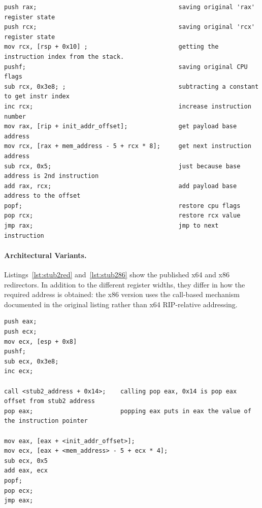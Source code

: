 \documentclass[runningheads]{llncs}
\begin{document}
\noindent\begin{minipage}{\linewidth}
\begin{lstlisting}[label={lst:stub2red},language={[x86masm]Assembler}, basicstyle=\scriptsize\ttfamily, caption={x64 redirector. Reproduced from Listing~3 of~\cite{zone_secrypt_2026}.}]
push rax;                                       saving original 'rax' register state
push rcx;                                       saving original 'rcx' register state
mov rcx, [rsp + 0x10] ;                         getting the instruction index from the stack.
pushf;                                          saving original CPU flags
sub rcx, 0x3e8; ;                               subtracting a constant to get instr index
inc rcx;                                        increase instruction number
mov rax, [rip + init_addr_offset];              get payload base address
mov rcx, [rax + mem_address - 5 + rcx * 8];     get next instruction address
sub rcx, 0x5;                                   just because base address is 2nd instruction
add rax, rcx;                                   add payload base address to the offset
popf;                                           restore cpu flags
pop rcx;                                        restore rcx value
jmp rax;                                        jmp to next instruction
\end{lstlisting}

\end{minipage}

\paragraph{Architectural Variants.}
Listings~\ref{lst:stub2red} and~\ref{lst:stub286} show the published x64 and x86 redirectors. In addition to the different register widths, they differ in how the required address is obtained: the x86 version uses the call-based mechanism documented in the original listing rather than x64 RIP-relative addressing.

\begin{lstlisting}[label={lst:stub286},language={[x86masm]Assembler}, basicstyle=\scriptsize\ttfamily, caption={x86 redirector. Reproduced from Listing~4 of~\cite{zone_secrypt_2026}.}]
push eax;
push ecx;
mov ecx, [esp + 0x8]
pushf;
sub ecx, 0x3e8;
inc ecx;

call <stub2_address + 0x14>;    calling pop eax, 0x14 is pop eax offset from stub2 address
pop eax;                        popping eax puts in eax the value of the instruction pointer

mov eax, [eax + <init_addr_offset>];
mov ecx, [eax + <mem_address> - 5 + ecx * 4];
sub ecx, 0x5
add eax, ecx
popf;
pop ecx;
jmp eax;
\end{lstlisting}
\end{document}
